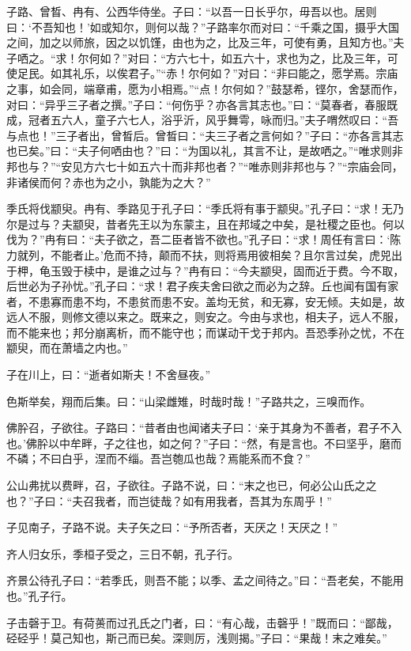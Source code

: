 \documentclass[a5paper]{ctexbook}
\begin{document}
    子路、曾晳、冉有、公西华侍坐。子曰：“以吾一日长乎尔，毋吾以也。居则曰：‘不吾知也！’如或知尔，则何以哉？”子路率尔而对曰：“千乘之国，摄乎大国之间，加之以师旅，因之以饥馑，由也为之，比及三年，可使有勇，且知方也。”夫子哂之。“求！尔何如？”对曰：“方六七十，如五六十，求也为之，比及三年，可使足民。如其礼乐，以俟君子。”“赤！尔何如？”对曰：“非曰能之，愿学焉。宗庙之事，如会同，端章甫，愿为小相焉。”“点！尔何如？”鼓瑟希，铿尔，舍瑟而作，对曰：“异乎三子者之撰。”子曰：“何伤乎？亦各言其志也。”曰：“莫春者，春服既成，冠者五六人，童子六七人，浴乎沂，风乎舞雩，咏而归。”夫子喟然叹曰：“吾与点也！”三子者出，曾晳后。曾晳曰：“夫三子者之言何如？”子曰：“亦各言其志也已矣。”曰：“夫子何哂由也？”曰：“为国以礼，其言不让，是故哂之。”“唯求则非邦也与？”“安见方六七十如五六十而非邦也者？”“唯赤则非邦也与？”“宗庙会同，非诸侯而何？赤也为之小，孰能为之大？”

    季氏将伐颛臾。冉有、季路见于孔子曰：“季氏将有事于颛臾。”孔子曰：“求！无乃尔是过与？夫颛臾，昔者先王以为东蒙主，且在邦域之中矣，是社稷之臣也。何以伐为？”冉有曰：“夫子欲之，吾二臣者皆不欲也。”孔子曰：“求！周任有言曰：‘陈力就列，不能者止。’危而不持，颠而不扶，则将焉用彼相矣？且尔言过矣，虎兕出于柙，龟玉毁于椟中，是谁之过与？”冉有曰：“今夫颛臾，固而近于费。今不取，后世必为子孙忧。”孔子曰：“求！君子疾夫舍曰欲之而必为之辞。丘也闻有国有家者，不患寡而患不均，不患贫而患不安。盖均无贫，和无寡，安无倾。夫如是，故远人不服，则修文德以来之。既来之，则安之。今由与求也，相夫子，远人不服，而不能来也；邦分崩离析，而不能守也；而谋动干戈于邦内。吾恐季孙之忧，不在颛臾，而在萧墙之内也。”

    子在川上，曰：“逝者如斯夫！不舍昼夜。”

    色斯举矣，翔而后集。曰：“山梁雌雉，时哉时哉！”子路共之，三嗅而作。

    佛肸召，子欲往。子路曰：“昔者由也闻诸夫子曰：‘亲于其身为不善者，君子不入也。’佛肸以中牟畔，子之往也，如之何？”子曰：“然，有是言也。不曰坚乎，磨而不磷；不曰白乎，涅而不缁。吾岂匏瓜也哉？焉能系而不食？”

    公山弗扰以费畔，召，子欲往。子路不说，曰：“末之也已，何必公山氏之之也？”子曰：“夫召我者，而岂徒哉？如有用我者，吾其为东周乎！”

    子见南子，子路不说。夫子矢之曰：“予所否者，天厌之！天厌之！”

    齐人归女乐，季桓子受之，三日不朝，孔子行。

    齐景公待孔子曰：“若季氏，则吾不能；以季、孟之间待之。”曰：“吾老矣，不能用也。”孔子行。

    子击磬于卫。有荷蒉而过孔氏之门者，曰：“有心哉，击磬乎！”既而曰：“鄙哉，硁硁乎！莫己知也，斯己而已矣。深则厉，浅则揭。”子曰：“果哉！末之难矣。”
\end{document}
